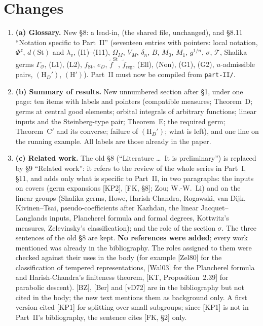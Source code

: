 \documentclass[11pt]{article}
\newcommand{\St}{\mathrm{St}}\newcommand{\sg}{\sigma}\newcommand{\reg}{\mathrm{reg}}
\begin{document}
\section*{Changes}
\begin{enumerate}[leftmargin=*]
\item \textbf{(a) Glossary.}  New \S8: a lead-in,
\verb|| (the shared file, unchanged), and \S8.11
``Notation specific to Part~II'' (seventeen entries with pointers:
local notation, $\Phi^z$, $d(\St)$ and $\lambda_v$, (I1)--(I11),
$\Omega_M$, $V_M$, $\delta_n$, $B$, $M_0$, $M_1$, $g^{1/n}$, $\sg$,
$\mathcal T$, Shalika germs $\Gamma_{\mathcal O}$, (L1), (L2),
$f_{\St}$, $e_D$, $\tilde f^{\St}$, $\tilde f_{\reg}$, (Ell), (Non),
(G1), (G2), $u$-admissible pairs, $(\mathrm H_D')$, $(\mathrm H')$).
Part~II must now be compiled from \texttt{part-II/}.

\item \textbf{(b) Summary of results.}  New unnumbered section after
\S1, under one page: ten items with labels and pointers (compatible
measures; Theorem~D; germs at central good elements; orbital integrals
of arbitrary functions; linear inputs and the Steinberg-type pair;
Theorem~E; the required germ; Theorem~C$'$ and its converse; failure
of $(\mathrm H_D')$; what is left), and one line on the running
example.  All labels are those already in the paper.

\item \textbf{(c) Related work.}  The old \S8 (``Literature \ldots\ It is
preliminary'') is replaced by \S9 ``Related work'': it refers to the
review of the whole series in Part~I, \S11, and adds only what is
specific to Part~II, in two paragraphs: the inputs on covers (germ
expansions [KP2], [FK, \S8]; Zou; W.-W.~Li) and on the linear groups
(Shalika germs, Howe, Harish-Chandra, Rogawski, van Dijk,
Kivinen--Tsai, pseudo-coefficients after Kazhdan, the linear
Jacquet--Langlands inputs, Plancherel formula and formal degrees,
Kottwitz's measures, Zelevinsky's classification); and the role of the
section $\sg$.  The three sentences of the old \S8 are kept.
\textbf{No references were added}; every work mentioned was already in
the bibliography.  The roles assigned to them were checked against
their uses in the body (for example [Zel80] for the classification of
tempered representations, [Wal03] for the Plancherel formula and
Harish-Chandra's finiteness theorem, [KT, Proposition~2.39] for
parabolic descent).  [BZ], [Ber] and [vD72] are in the bibliography
but not cited in the body; the new text mentions them as background
only.  A first version cited [KP1] for splitting over small subgroups;
since [KP1] is not in Part~II's bibliography, the sentence cites
[FK, \S2] only.


\end{enumerate}
\end{document}
